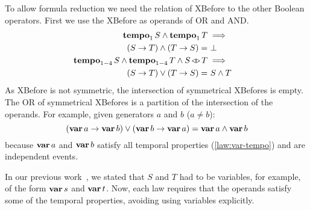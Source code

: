 To allow formula reduction we need the relation of \ac{XBefore} to the other Boolean operators.
First we use the \ac{XBefore} as operands of \ac{OR} and \ac{AND}.
%
\begin{subequations}
\begin{align}
\tempo[1]{S} \land \tempo[1]{T}&\implies\nonumber\\
  \parsin{\xbefore{S}{T}} \land \parsin{\xbefore{T}{S}} =&~
  \bot &
  \label{thm:xbefore-inf-equiv-bot}\\
%
\tempo{S} \land \tempo{T} \land \independentevents{S}{T}&\implies\nonumber\\
  \parsin{\xbefore{S}{T}} \lor \parsin{\xbefore{T}{S}} =&~
  S \land T &
  \label{thm:xbefore-sup-equiv-inf}
%
\end{align}
\end{subequations}
%
As \ac{XBefore} is not symmetric, the intersection of symmetrical \acp{XBefore} is empty.
The \ac{OR} of symmetrical \acp{XBefore} is a partition of the intersection of the operands.
For example, given generators $a$ and $b$ ($a \neq b$):
\begin{equation}
\left(\operatorname{\mathbf{var}} a \rightarrow \operatorname{\mathbf{var}} b\right) \lor \left(\operatorname{\mathbf{var}} b \rightarrow \operatorname{\mathbf{var}} a\right) = \operatorname{\mathbf{var}} a \land \operatorname{\mathbf{var}} b
\end{equation}
%
because $\operatorname{\mathbf{var}} a$ and $\operatorname{\mathbf{var}} b$ satisfy all temporal properties (\cref{law:var-tempo}) and are independent events.

In our previous work~\cite{DM2015}, we stated that $S$ and $T$ had to be variables, for example, of the form $\operatorname{\mathbf{var}} s$ and $\operatorname{\mathbf{var}} t$.
Now, each law requires that the operands satisfy some of the temporal properties, avoiding using variables explicitly.


